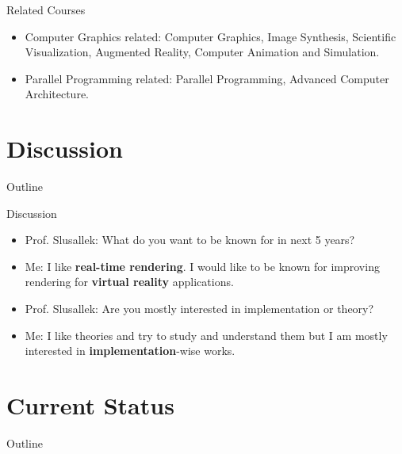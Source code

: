 \documentclass{beamer}
\begin{document}
\begin{frame}{Related Courses}
	\begin{itemize}
		\item Computer Graphics related: Computer Graphics, Image Synthesis, Scientific Visualization, Augmented Reality, Computer Animation and Simulation.
		\item Parallel Programming related: Parallel Programming, Advanced Computer Architecture.
	\end{itemize}
\end{frame}


\section{Discussion}

\begin{frame}{Outline}
\end{frame}

\begin{frame}{Discussion}
	\begin{itemize}
		\item Prof. Slusallek: What do you want to be known for in next 5 years?
		\item Me: I like \textbf{real-time rendering}. I would like to be known for improving rendering for \textbf{virtual reality} applications.
		\item Prof. Slusallek: Are you mostly interested in implementation or theory?
		\item Me: I like theories and try to study and understand them but I am mostly interested in \textbf{implementation}-wise works.
	\end{itemize}
\end{frame}


\section{Current Status}

\begin{frame}{Outline}
\end{frame}
\end{document}
